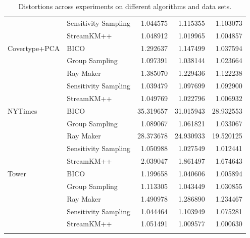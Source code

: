 \begin{longtable}{llrrr}
      & Sensitivity Sampling &   1.044575 &   1.115355 &   1.103073 \\
      & StreamKM++ &   1.048912 &   1.019965 &   1.004857 \\
\midrule
Covertype+PCA & BICO &   1.292637 &   1.147499 &   1.037594 \\
      & Group Sampling &   1.097391 &   1.038144 &   1.023664 \\
      & Ray Maker &   1.385070 &   1.229436 &   1.122238 \\
      & Sensitivity Sampling &   1.039479 &   1.097699 &   1.092900 \\
      & StreamKM++ &   1.049769 &   1.022796 &   1.006932 \\
\midrule
NYTimes & BICO &  35.319657 &  31.015943 &  28.932553 \\
      & Group Sampling &   1.089067 &   1.061821 &   1.033067 \\
      & Ray Maker &  28.373678 &  24.930933 &  19.520125 \\
      & Sensitivity Sampling &   1.050988 &   1.027549 &   1.012441 \\
      & StreamKM++ &   2.039047 &   1.861497 &   1.674643 \\
\midrule
Tower & BICO &   1.199658 &   1.040606 &   1.005894 \\
      & Group Sampling &   1.113305 &   1.043449 &   1.030855 \\
      & Ray Maker &   1.490978 &   1.286890 &   1.234467 \\
      & Sensitivity Sampling &   1.044464 &   1.103949 &   1.075281 \\
      & StreamKM++ &   1.051491 &   1.009577 &   1.000630 \\
\bottomrule
\caption{Distortions across experiments on different algorithms and data sets.}
\label{tab:comparison-solution-generation-all}
\end{longtable}





















